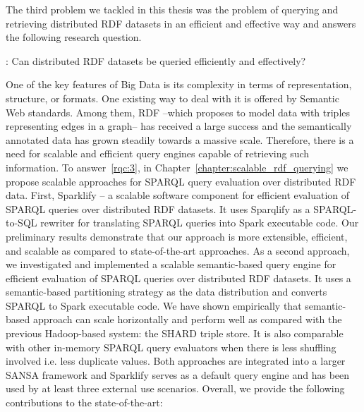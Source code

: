 The third problem we tackled in this thesis was the problem of querying and retrieving distributed \gls{RDF} datasets in an efficient and effective way and answers the following research question.

\begin{tcolorbox}
\textbf{\rqNr[RQ3]\label{rqc:3}}: Can distributed \gls{RDF} datasets be queried efficiently and effectively?
\end{tcolorbox}

One of the key features of Big Data is its complexity in terms of representation, structure, or formats.
One existing way to deal with it is offered by Semantic Web standards.
Among them, \gls{RDF} --which proposes to model data with triples representing edges in a graph-- has received a large success and the semantically annotated data has grown steadily towards a massive scale.
Therefore, there is a need for scalable and efficient query engines capable of retrieving such information.
To answer~\ref{rqc:3}, in Chapter~\ref{chapter:scalable_rdf_querying} we propose scalable approaches for \gls{SPARQL} query evaluation over distributed \gls{RDF} data. 
First, Sparklify -- a scalable software component for efficient evaluation of \gls{SPARQL} queries over distributed \gls{RDF} datasets. 
It uses Sparqlify as a SPARQL-to-SQL rewriter for translating SPARQL queries into Spark executable code.
Our preliminary results demonstrate that our approach is more extensible, efficient, and scalable as compared to state-of-the-art approaches.
As a second approach, we investigated and implemented a scalable semantic-based query engine for efficient evaluation of \gls{SPARQL} queries over distributed \gls{RDF} datasets. 
It uses a semantic-based partitioning strategy as the data distribution and converts \gls{SPARQL} to Spark executable code.
We have shown empirically that semantic-based approach can scale horizontally and perform well as compared with the previous Hadoop-based system: the SHARD triple store.
It is also comparable with other in-memory \gls{SPARQL} query evaluators when there is less shuffling involved i.e. less duplicate values.
Both approaches are integrated into a larger SANSA framework and Sparklify serves as a default query engine and has been used by at least three external use scenarios.
Overall, we provide the following contributions to the state-of-the-art:

